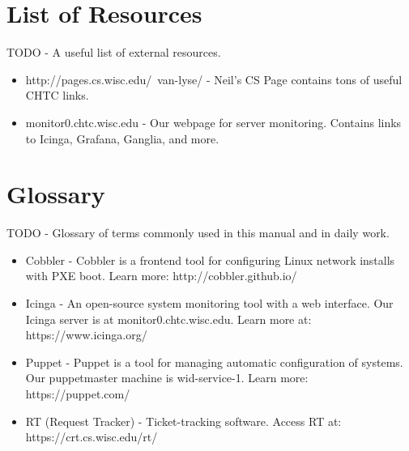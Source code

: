 \documentclass[10pt,letterpaper]{article}
\begin{document}
\clearpage

\section{List of Resources}
    TODO - A useful list of external resources.
    \begin{itemize}
        \item http://pages.cs.wisc.edu/~van-lyse/ - Neil's CS Page contains tons
        of useful CHTC links.
        \item monitor0.chtc.wisc.edu - Our webpage for server monitoring. Contains
        links to Icinga, Grafana, Ganglia, and more.
    \end{itemize}
\clearpage

\section{Glossary}
    TODO - Glossary of terms commonly used in this manual and in daily work.
    \begin{itemize}
        \item Cobbler - Cobbler is a frontend tool for configuring Linux network
        installs with PXE boot. Learn more: http://cobbler.github.io/
        \item Icinga - An open-source system monitoring tool with a web interface.
        Our Icinga server is at monitor0.chtc.wisc.edu. Learn more at: https://www.icinga.org/
        \item Puppet - Puppet is a tool for managing automatic configuration of
        systems. Our puppetmaster machine is wid-service-1. Learn more:
        https://puppet.com/
        \item RT (Request Tracker) - Ticket-tracking software. Access RT at:
        https://crt.cs.wisc.edu/rt/
    \end{itemize}
\clearpage
\end{document}
